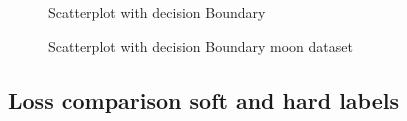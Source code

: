 \documentclass[12pt,a4paper]{scrartcl}
\begin{document}
	\begin{figure}[H]
		\centering	
		\caption{Scatterplot with decision Boundary}
		\label{fig:ex1_2_boundary_blob}
	\end{figure}

	\begin{figure}[H]
		\centering	
		\caption{Scatterplot with decision Boundary moon dataset}
		\label{fig:ex1_2_boundary_moon}
	\end{figure}

	\subsection*{Loss comparison soft and hard labels}
	
\end{document}
